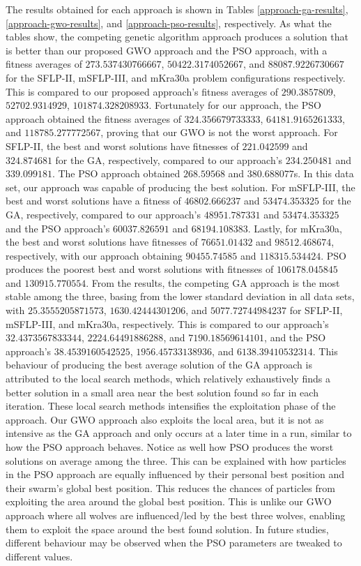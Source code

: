 The results obtained for each approach is shown in Tables \ref{approach-ga-results}, \ref{approach-gwo-results}, and \ref{approach-pso-results}, respectively. As what the tables show, the competing genetic algorithm approach produces a solution that is better than our proposed GWO approach and the PSO approach, with a fitness averages of $273.537430766667$, $50422.3174052667$, and $88087.9226730667$ for the SFLP-II, mSFLP-III, and mKra30a problem configurations respectively. This is compared to our proposed approach's fitness averages of $290.3857809$, $52702.9314929$, $101874.328208933$. Fortunately for our approach, the PSO approach obtained the fitness averages of $324.356679733333$, $64181.9165261333$, and $118785.277772567$, proving that our GWO is not the worst approach. For SFLP-II, the best and worst solutions have fitnesses of $221.042599$ and $324.874681$ for the GA, respectively, compared to our approach's $234.250481$ and $339.099181$. The PSO approach obtained $268.59568$ and $380.688077$s. In this data set, our approach was capable of producing the best solution. For mSFLP-III, the best and worst solutions have a fitness of $46802.666237$ and $53474.353325$ for the GA, respectively, compared to our approach's $48951.787331$ and $53474.353325$ and the PSO approach's $60037.826591$ and $68194.108383$. Lastly, for mKra30a, the best and worst solutions have fitnesses of $76651.01432$ and $98512.468674$, respectively, with our approach obtaining $90455.74585$ and $118315.534424$. PSO produces the poorest best and worst solutions with fitnesses of $106178.045845$ and $130915.770554$. From the results, the competing GA approach is the most stable among the three, basing from the lower standard deviation in all data sets, with $25.3555205871573$, $1630.42444301206$, and $5077.72744984237$ for SFLP-II, mSFLP-III, and mKra30a, respectively. This is compared to our approach's $32.4373567833344$, $2224.64491886288$, and $7190.18569614101$, and the PSO approach's $38.4539160542525$, $1956.45733138936$, and $6138.39410532314$. This behaviour of producing the best average solution of the GA approach is attributed to the local search methods, which relatively exhaustively finds a better solution in a small area near the best solution found so far in each iteration. These local search methods intensifies the exploitation phase of the approach. Our GWO approach also exploits the local area, but it is not as intensive as the GA approach and only occurs at a later time in a run, similar to how the PSO approach behaves. Notice as well how PSO produces the worst solutions on average among the three. This can be explained with how particles in the PSO approach are equally influenced by their personal best position and their swarm's global best position. This reduces the chances of particles from exploiting the area around the global best position. This is unlike our GWO approach where all wolves are influenced/led by the best three wolves, enabling them to exploit the space around the best found solution. In future studies, different behaviour may be observed when the PSO parameters are tweaked to different values.


